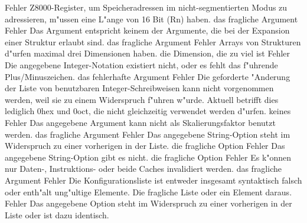 \documentclass[12pt,a4paper,twoside]{report}
\begin{document}
\begin{description}
               {Fehler}
               {Z8000-Register, um Speicheradressen im nicht-segmentierten Modus zu adressieren, m"ussen
                eine L"ange von 16 Bit (Rn) haben.}
               {das fragliche Argument}
               {Fehler}
               {Das Argument entspricht keinem der Argumente, die bei der Expansion einer
                Struktur erlaubt sind.}
               {das fragliche Argument}
               {Fehler}
               {Arrays von Strukturen d"urfen maximal drei Dimensionen haben.}
               {die Dimension, die zu viel ist}
               {Fehler}
               {Die angegebene Integer-Notation existiert nicht, oder es fehlt das
                f"uhrende Plus/Minuszeichen.}
               {das fehlerhafte Argument}
               {Fehler}
               {Die geforderte "Anderung der Liste von benutzbaren Integer-Schreibweisen
                kann nicht vorgenommen werden, weil sie zu einem Widerspruch f"uhren
                w"urde.  Aktuell betrifft dies lediglich 0hex und 0oct, die nicht
                gleichzeitig verwendet werden d"urfen.}
               {keines}
               {Fehler}
               {Das angegebene Argument kann nicht als Skalierungsfaktor benutzt werden.}
               {das fragliche Argument}
               {Fehler}
               {Das angegebene String-Option steht im Widerspruch zu einer vorherigen in der Liste.}
               {die fragliche Option}
               {Fehler}
               {Das angegebene String-Option gibt es nicht.}
               {die fragliche Option}
               {Fehler}
               {Es k"onnen nur Daten-, Instruktions- oder beide Caches invalidiert werden.}
               {das fragliche Argument}
               {Fehler}
               {Die Konfigurationsliste ist entweder insgesamt syntaktisch falsch oder 
                enth"alt ung"ultige Elemente.}
               {Die fragliche Liste oder ein Element daraus.}
               {Fehler}
               {Das angegebene Option steht im Widerspruch zu einer vorherigen in der Liste oder ist dazu identisch.}

\end{description}
\end{document}
